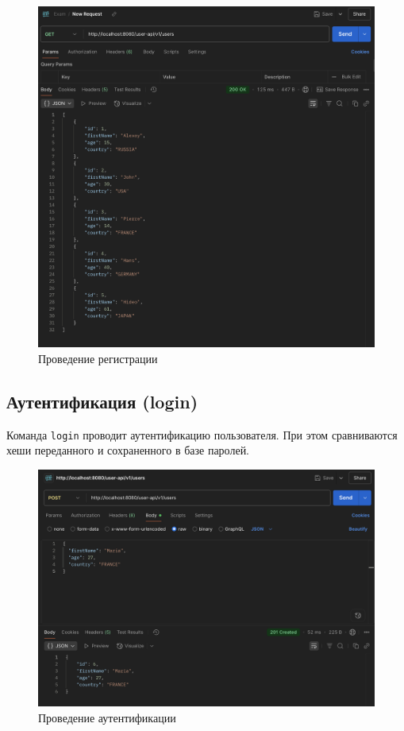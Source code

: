 \documentclass[a4paper, 14pt]{article}
\begin{document}
\begin{figure}[H]
	\centering
	\includegraphics[width=13cm]{resources/5.png}
	\caption{Проведение регистрации}
\end{figure}

\subsection{Аутентификация (login)}

Команда \texttt{login} проводит аутентификацию пользователя. При этом сравниваются хеши переданного и сохраненного в базе паролей.

\begin{figure}[H]
	\centering
	\includegraphics[width=13cm]{resources/6.png}
	\caption{Проведение аутентификации}
\end{figure}
\end{document}
